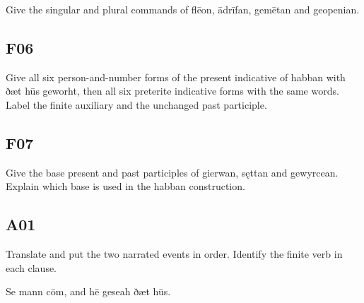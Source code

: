 \par\begin{minipage}{\linewidth}\raggedright
Give the singular and plural commands of flēon, ādrīfan, gemētan and geopenian.

\end{minipage}\par\addvspace{4pt}

\subsection*{F06}

\par\begin{minipage}{\linewidth}\raggedright
Give all six person-and-number forms of the present indicative of habban with ðæt hūs geworht, then all six preterite indicative forms with the same words. Label the finite auxiliary and the unchanged past participle.

\end{minipage}\par\addvspace{4pt}

\subsection*{F07}

\par\begin{minipage}{\linewidth}\raggedright
Give the base present and past participles of gierwan, sęttan and gewyrcean. Explain which base is used in the habban construction.

\end{minipage}\par\addvspace{4pt}

\subsection*{A01}

\par\begin{minipage}{\linewidth}\raggedright
Translate and put the two narrated events in order. Identify the finite verb in each clause.

Se mann cōm, and hē geseah ðæt hūs.

\end{minipage}\par\addvspace{4pt}

